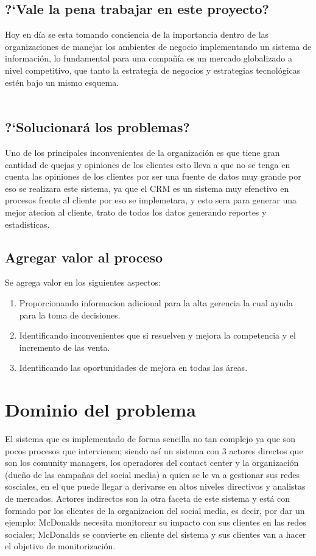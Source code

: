 \subsection{?`Vale la pena trabajar en este proyecto?}
Hoy en d\'ia se esta tomando conciencia de la importancia dentro de las organizaciones de manejar los ambientes de negocio implementando un sistema de informaci\'on, lo fundamental para una compa\~n\'ia es un mercado globalizado a nivel competitivo, que tanto la estrategia de negocios y estrategias tecnol\'ogicas est\'en bajo un mismo esquema.%
\\%
\\%
\subsection{?`Solucionar\'a los problemas?}
Uno de los principales inconvenientes de la organizaci\'on es que tiene gran cantidad de quejas y opiniones de los clientes esto lleva a que no se tenga en cuenta las opiniones de los clientes por ser una fuente de datos muy grande por eso se realizara este sistema, ya que el CRM es un sistema muy efenctivo en procesos frente al cliente por eso se implemetara, y esto sera para generar una mejor atecion al cliente, trato de todos los datos generando reportes y estadisticas.%
%
\subsection{Agregar valor al proceso}
Se agrega valor en los siguientes aspectos:%
\begin{enumerate}
	\item Proporcionando informacion adicional para la alta gerencia la cual ayuda para la toma de decisiones.
	\item Identificando inconvenientes que si resuelven y mejora la competencia y el incremento de las venta.
	\item Identificando las oportunidades de mejora en todas las \'areas.
\end{enumerate}%
%
\section{Dominio del problema}
El sistema que es implementado de forma sencilla no tan complejo ya que son pocos procesos que intervienen; siendo as\'i un sistema con 3 actores directos que son los comunity managers, los operadores del contact center y la organizaci\'on (due\~no de las campa\~nas del social media) a quien se le va a gestionar sus redes sosciales, en el que puede llegar a derivarse en altos niveles directivos y analistas de mercados. Actores indirectos son la otra faceta de este sistema y est\'a con formado por los clientes de la organizacion del social media, es decir, por dar un ejemplo: McDonalds necesita monitorear su impacto con sus clientes en las redes sociales; McDonalds se convierte en cliente del sistema y sus clientes van a hacer el objetivo de monitorizaci\'on.
%
%
